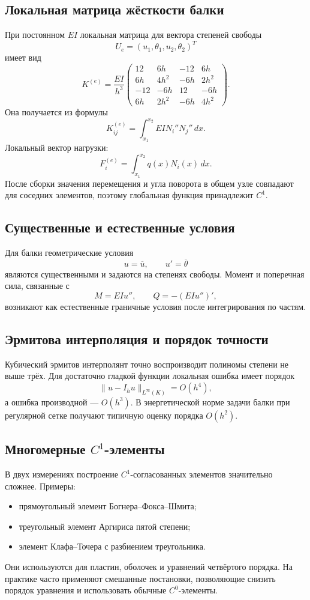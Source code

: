 \subsection{Локальная матрица жёсткости балки}

При постоянном $EI$ локальная матрица для вектора степеней свободы
\[
    U_e=(u_1,\theta_1,u_2,\theta_2)^T
\]
имеет вид
\[
K^{(e)}=\frac{EI}{h^3}
\begin{pmatrix}
12&6h&-12&6h\\
6h&4h^2&-6h&2h^2\\
-12&-6h&12&-6h\\
6h&2h^2&-6h&4h^2
\end{pmatrix}.
\]
Она получается из формулы
\[
    K_{ij}^{(e)}=\int_{x_1}^{x_2}EI N_i''N_j''\,dx.
\]
Локальный вектор нагрузки:
\[
    F_i^{(e)}=\int_{x_1}^{x_2}q(x)N_i(x)\,dx.
\]
После сборки значения перемещения и угла поворота в общем узле совпадают для
соседних элементов, поэтому глобальная функция принадлежит $C^1$.

\subsection{Существенные и естественные условия}

Для балки геометрические условия
\[
    u=\overline u,
    \qquad
    u'=\overline\theta
\]
являются существенными и задаются на степенях свободы. Момент и поперечная сила,
связанные с
\[
    M=EIu'',
    \qquad
    Q=-(EIu'')',
\]
возникают как естественные граничные условия после интегрирования по частям.

\subsection{Эрмитова интерполяция и порядок точности}

Кубический эрмитов интерполянт точно воспроизводит полиномы степени не выше
трёх. Для достаточно гладкой функции локальная ошибка имеет порядок
\[
    \|u-I_hu\|_{L^{\infty}(K)}=O(h^4),
\]
а ошибка производной --- $O(h^3)$. В энергетической норме задачи балки при
регулярной сетке получают типичную оценку порядка $O(h^2)$.

\subsection[Многомерные C1-элементы]{Многомерные $C^1$-элементы}

В двух измерениях построение $C^1$-согласованных элементов значительно сложнее.
Примеры:
\begin{itemize}
    \item прямоугольный элемент Богнера--Фокса--Шмита;
    \item треугольный элемент Аргириса пятой степени;
    \item элемент Клафа--Точера с разбиением треугольника.
\end{itemize}
Они используются для пластин, оболочек и уравнений четвёртого порядка.
На практике часто применяют смешанные постановки, позволяющие снизить порядок
уравнения и использовать обычные $C^0$-элементы.

